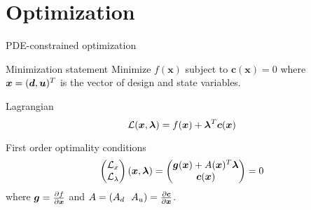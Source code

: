 \documentclass{beamer}
\begin{document}
\section{Optimization}
\begin{frame}{PDE-constrained optimization}
  \begin{block}{Minimization statement}
    Minimize $f(\bm x)$ subject to $\bm c(\bm x) = 0$ where $\bm x =
    (\bm d,\bm u)^T$ is the vector of design and state variables.
  \end{block}
  \begin{block}{Lagrangian}
    \begin{equation*}
      \mathcal L(\bm x,\bm \lambda) = f(\bm x) + \bm \lambda^T \bm c(\bm x)
    \end{equation*}
  \end{block}
  \begin{block}{First order optimality conditions}
    \begin{equation*}
      \begin{pmatrix}
        \mathcal L_x \\
        \mathcal L_\lambda
      \end{pmatrix}
      (\bm x,\bm \lambda) =
      \begin{pmatrix}
        \bm g (\bm x) + A(\bm x)^T \bm \lambda \\
        \bm c(\bm x)
      \end{pmatrix}
      = 0
    \end{equation*}
    where $\bm g = \frac{\partial f}{\partial \bm x}$ and $A = (A_d \ \ A_u) = \frac{\partial \bm c}{\partial \bm x}$.
  \end{block}
\end{frame}
\end{document}
